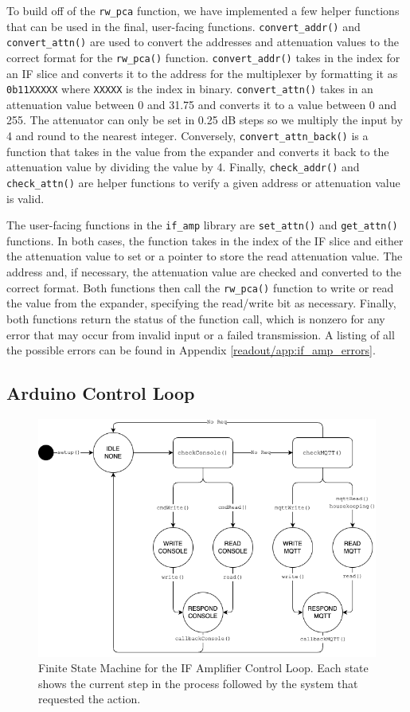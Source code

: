 To build off of the \texttt{rw\_pca} function, we have implemented a few helper functions that can be used in the final, user-facing functions.
\texttt{convert\_addr()} and \texttt{convert\_attn()} are used to convert the addresses and attenuation values to the correct format for the \texttt{rw\_pca()} function.
\texttt{convert\_addr()} takes in the index for an IF slice and converts it to the address for the multiplexer by formatting it as \texttt{0b11XXXXX} where \texttt{XXXXX} is the index in binary.
\texttt{convert\_attn()} takes in an attenuation value between 0 and 31.75 and converts it to a value between 0 and 255.
The attenuator can only be set in 0.25 dB steps so we multiply the input by 4 and round to the nearest integer.
Conversely, \texttt{convert\_attn\_back()} is a function that takes in the value from the expander and converts it back to the attenuation value by dividing the value by 4.
Finally, \texttt{check\_addr()} and \texttt{check\_attn()} are helper functions to verify a given address or attenuation value is valid.

The user-facing functions in the \texttt{if\_amp} library are \texttt{set\_attn()} and \texttt{get\_attn()} functions.
In both cases, the function takes in the index of the IF slice and either the attenuation value to set or a pointer to store the read attenuation value.
The address and, if necessary, the attenuation value are checked and converted to the correct format.
Both functions then call the \texttt{rw\_pca()} function to write or read the value from the expander, specifying the read/write bit as necessary.
Finally, both functions return the status of the function call, which is nonzero for any error that may occur from invalid input or a failed transmission.
A listing of all the possible errors can be found in Appendix \ref{readout/app:if_amp_errors}.

\subsection{Arduino Control Loop}
\begin{figure}
    \centering
    \includegraphics[width=.8\textwidth]{figs/readout/FSM_IF.png}
    \caption[Finite State Machine for the IF Amplifier Control Loop]{Finite State Machine for the IF Amplifier Control Loop. Each state shows the current step in the process followed by the system that requested the action.}
    \label{readout/fig:if_amp_fsm}
\end{figure}

